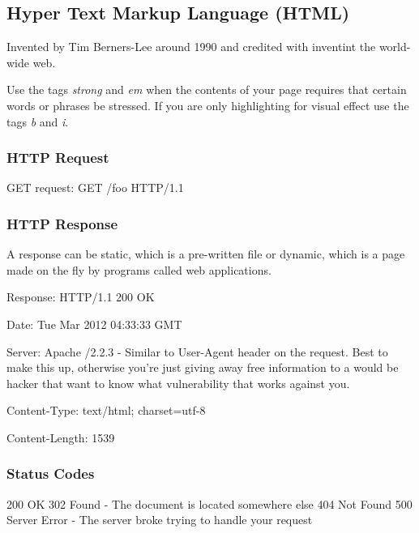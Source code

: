 \documentclass[12pt]{article}
\begin{document}
\subsection*{Hyper Text Markup Language (HTML)}

Invented by Tim Berners-Lee around 1990 and credited with inventint the world-wide web.

Use the tags \emph{strong} and \emph{em} when the contents of your page requires that certain words or phrases be stressed. If you are only highlighting for visual effect use the tags \emph{b} and \emph{i}.

\subsubsection*{HTTP Request}
GET request: GET /foo HTTP/1.1

\subsubsection*{HTTP Response}
A response can be static, which is a pre-written file or dynamic, which is a page made on the fly by programs called web applications.

\begin{list}{*}{
\setlength{\itemsep}{0pt}
\setlength{\parsep}{0pt}
\setlength{\topsep}{0pt}
\setlength{\partopsep}{0pt}
\setlength{\leftmargin}{2em}
\setlength{\labelwidth}{1.5em}
\setlength{\labelsep}{0.5em}
}
\item Response: HTTP/1.1 200 OK
\item Date: Tue Mar 2012 04:33:33 GMT
\item Server: Apache /2.2.3 - Similar to User-Agent header on the request. Best to make this up, otherwise you're just giving away free information to a would be hacker that want to know what vulnerability that works against you.
\item Content-Type: text/html; charset=utf-8
\item Content-Length: 1539
\end{list}

\subsubsection*{Status Codes}
200 OK
302 Found - The document is located somewhere else
404 Not Found
500 Server Error - The server broke trying to handle your request
\end{document}
